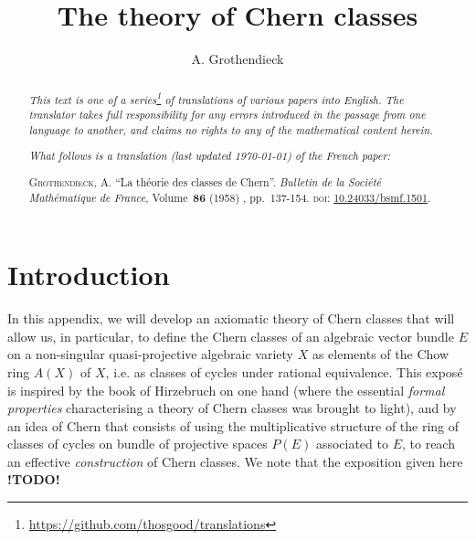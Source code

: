 \documentclass{article}
\theoremstyle{plain}
\theoremstyle{definition}
\newcommand{\todo}{\textbf{ !TODO! }}
\begin{document}
\renewcommand{\abstractname}{Translator's note.}

\title{The theory of Chern classes}
\author{A. Grothendieck}
\date{}
\maketitle

\begin{abstract}
  \renewcommand*{\thefootnote}{\fnsymbol{footnote}}
  \emph{This text is one of a series\footnote{\url{https://github.com/thosgood/translations}} of translations of various papers into English.}
  \emph{The translator takes full responsibility for any errors introduced in the passage from one language to another, and claims no rights to any of the mathematical content herein.}
  
  \emph{What follows is a translation (last updated \today) of the French paper:}

  \medskip\noindent
  \textsc{Grothendieck, A.}
  ``La th\'{e}orie des classes de Chern''.
  \emph{Bulletin de la Soci\'{e}t\'{e} Math\'{e}matique de France}, Volume~\textbf{86} (1958) , pp.~137-154.
  \textsc{doi}: \href{https://www.doi.org/10.24033/bsmf.1501}{10.24033/bsmf.1501}.
\end{abstract}

\setcounter{footnote}{0}

\tableofcontents



\bigskip\bigskip


\section*{Introduction}

In this appendix, we will develop an axiomatic theory of Chern classes that will allow us, in particular, to define the Chern classes of an algebraic vector bundle $E$ on a non-singular quasi-projective algebraic variety $X$ as elements of the Chow ring $A(X)$ of $X$, i.e. as classes of cycles under rational equivalence.
This expos\'{e} is inspired by the book of Hirzebruch on one hand (where the essential \emph{formal properties} characterising a theory of Chern classes was brought to light), and by an idea of Chern \cite{2} that consists of using the multiplicative structure of the ring of classes of cycles on bundle of projective spaces $P(E)$ associated to $E$, to reach an effective \emph{construction} of Chern classes.
We note that the exposition given here \todo
\end{document}
